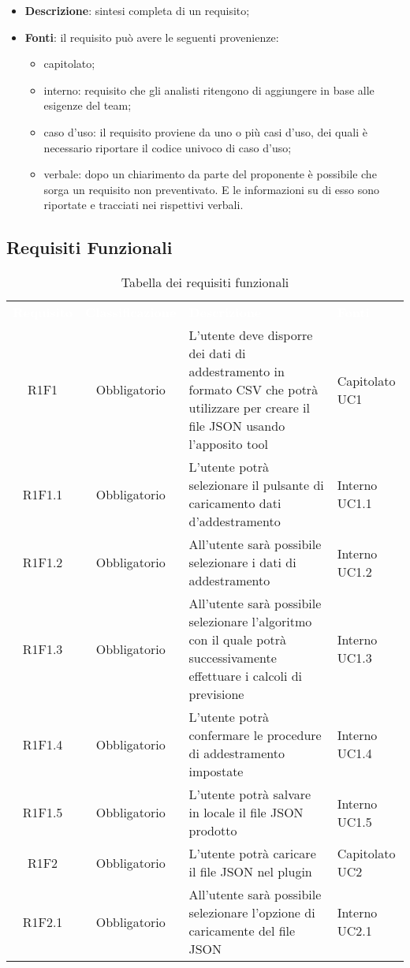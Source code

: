 \begin{itemize}
					\item \textbf{Descrizione}: sintesi completa di un requisito;
					\item \textbf{Fonti}: il requisito può avere le seguenti provenienze:
					\begin{itemize}
						\item capitolato;
						\item interno: requisito che gli analisti ritengono di aggiungere in base alle esigenze del team;
						\item caso d'uso: il requisito proviene da uno o più casi d'uso, dei quali è necessario riportare il codice univoco di caso d'uso;
						\item verbale: dopo un chiarimento da parte del proponente è possibile che sorga un requisito non preventivato. E le informazioni su di esso sono riportate e tracciati nei rispettivi verbali.
					\end{itemize}
				\end{itemize} 	


	\subsection{Requisiti Funzionali}

\begin{table}[H]
\centering\renewcommand{\arraystretch}{1.5}
\caption{Tabella dei requisiti funzionali}
\vspace{0.2cm}
\begin{tabular}{ c  c  p{4 cm} C{2.5 cm} }
\textcolor{white}{\textbf{Requisito}} & \textcolor{white}{\textbf{Classificazione}} & 
\textcolor{white}{\textbf{Descrizione}} & \textcolor{white}{\textbf{Fonti}} \\
R1F1 & Obbligatorio & L’utente deve disporre dei dati di addestramento in formato CSV che potrà utilizzare  per creare il file JSON usando l’apposito tool & Capitolato UC1\\
R1F1.1 & Obbligatorio & L’utente potrà selezionare il pulsante di caricamento dati d'addestramento &  Interno UC1.1\\
R1F1.2 & Obbligatorio & All’utente sarà possibile selezionare i dati di addestramento &  Interno UC1.2\\
R1F1.3 & Obbligatorio & All’utente sarà possibile selezionare l’algoritmo con il quale potrà successivamente effettuare i calcoli di previsione &  Interno UC1.3\\
R1F1.4 & Obbligatorio & L’utente potrà confermare le procedure di addestramento impostate &  Interno UC1.4\\
R1F1.5 & Obbligatorio & L’utente potrà salvare in locale il file JSON prodotto & Interno UC1.5\\
R1F2 & Obbligatorio & L’utente potrà caricare il file JSON nel plugin & Capitolato UC2\\
R1F2.1 & Obbligatorio & All’utente sarà possibile selezionare l’opzione di caricamente del file JSON &  Interno UC2.1\\
\end{tabular}
\end{table}


